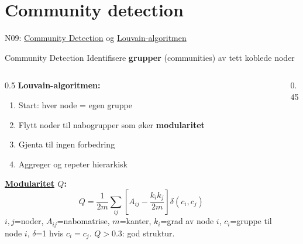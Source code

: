 \documentclass[aspectratio=169, 10pt]{beamer}
\begin{document}
\section{Community detection}

\begin{frame}{N09: \href{https://en.wikipedia.org/wiki/Community_structure}{Community Detection} og \href{https://en.wikipedia.org/wiki/Louvain_method}{Louvain-algoritmen}}
    
    \begin{block}{Community Detection}
        Identifisere \textbf{grupper} (communities) av tett koblede noder
    \end{block}
    
    \vspace{2mm}
    
    \begin{columns}
        \begin{column}{0.5\textwidth}
            \textbf{Louvain-algoritmen:}
            \begin{enumerate}
                \item Start: hver node = egen gruppe
                \item Flytt noder til nabogrupper som øker \textbf{modularitet}
                \item Gjenta til ingen forbedring
                \item Aggreger og repeter hierarkisk
            \end{enumerate}
            
            \vspace{2mm}
            
            \textbf{\href{https://en.wikipedia.org/wiki/Modularity_(networks)}{Modularitet} $Q$:}
            \footnotesize
            \[
            Q = \frac{1}{2m}\sum_{ij}\left[A_{ij} - \frac{k_i k_j}{2m}\right]\delta(c_i, c_j)
            \]
            \scriptsize $i,j$=noder, $A_{ij}$=nabomatrise, $m$=kanter, $k_i$=grad av node $i$, $c_i$=gruppe til node $i$, $\delta$=1 hvis $c_i=c_j$. $Q > 0.3$: god struktur.
        \end{column}
        
        \begin{column}{0.45\textwidth}
            \begin{center}
\end{center}
\end{column}
\end{columns}
\end{frame}
\end{document}
